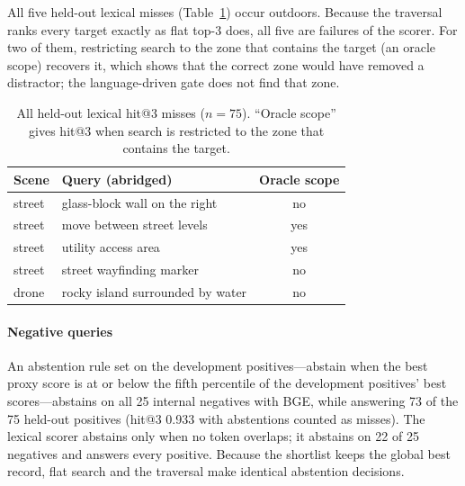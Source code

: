 \documentclass{ieeeaccess}
\begin{document}
All five held-out lexical misses (Table~\ref{tab:failures}) occur outdoors.
Because the traversal ranks every target exactly as flat top-3 does, all five are
failures of the scorer.
For two of them, restricting search to the zone that contains the target (an
oracle scope) recovers it, which shows that the correct zone would have removed a
distractor; the language-driven gate does not find that zone.

\begin{table}[!t]
\centering
\caption{All held-out lexical hit@3 misses ($n=75$). ``Oracle scope'' gives hit@3
when search is restricted to the zone that contains the target.}
\label{tab:failures}
\footnotesize
\begin{tabular}{lp{}c}
\toprule
Scene & Query (abridged) & Oracle scope \\
\midrule
street & glass-block wall on the right & no \\
street & move between street levels & yes \\
street & utility access area & yes \\
street & street wayfinding marker & no \\
drone & rocky island surrounded by water & no \\
\bottomrule
\end{tabular}
\end{table}

\paragraph{Negative queries}
An abstention rule set on the development positives---abstain when the best proxy
score is at or below the fifth percentile of the development positives' best
scores---abstains on all 25 internal negatives with BGE, while answering 73 of the
75 held-out positives (hit@3 0.933 with abstentions counted as misses). The
lexical scorer abstains only when no token overlaps; it abstains on 22 of 25
negatives and answers every positive. Because the shortlist keeps the global best
record, flat search and the traversal make identical abstention decisions.
\end{document}
